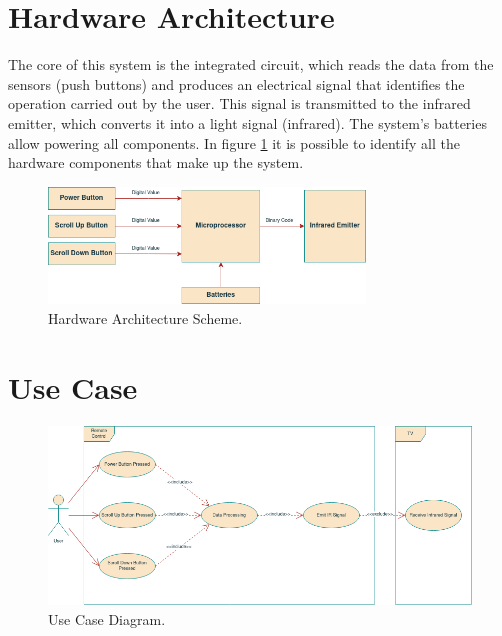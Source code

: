 \documentclass[12pt, letterpaper]{report}
\begin{document}
\section{Hardware Architecture}
The core of this system is the integrated circuit, which reads the data from the sensors (push buttons) and produces an electrical signal that identifies the operation carried out by the user. This signal is transmitted to the infrared emitter, which converts it into a light signal (infrared). The system's batteries allow powering all components. In figure \ref{fig:hw_arch} it is possible to identify all the hardware components that make up the system. 

\begin{figure}[ht]
	\centering
	\includegraphics[width=0.75\textwidth]{HW_Arch}
	\caption{Hardware Architecture Scheme.}
	\label{fig:hw_arch}
\end{figure}


\section{Use Case}

\begin{figure}[ht]
	\centering
	\includegraphics[width=1.2\textwidth]{Use-Case}
	\caption{Use Case Diagram.}
	\label{fig:use_case}
\end{figure}
\end{document}
